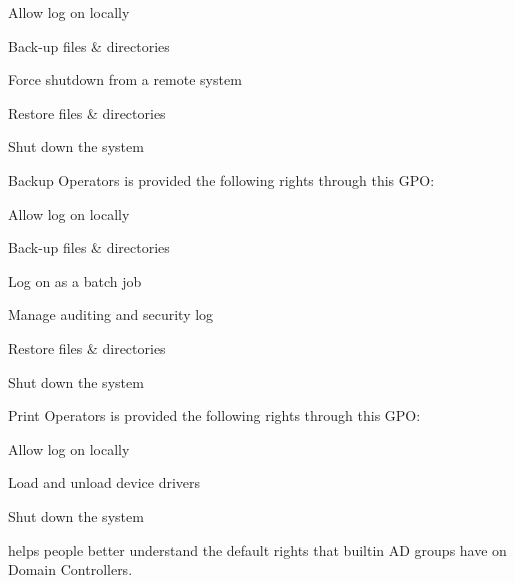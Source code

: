 Allow log on locally

Back-up files \& directories

Force shutdown from a remote system

Restore files \& directories

Shut down the system

Backup Operators is provided the following rights through this GPO:

Allow log on locally

Back-up files \& directories

Log on as a batch job

Manage auditing and security log

Restore files \& directories

Shut down the system

Print Operators is provided the following rights through this GPO:

Allow log on locally

Load and unload device drivers

Shut down the system

helps people better understand the default rights that builtin AD groups have on Domain Controllers.

 